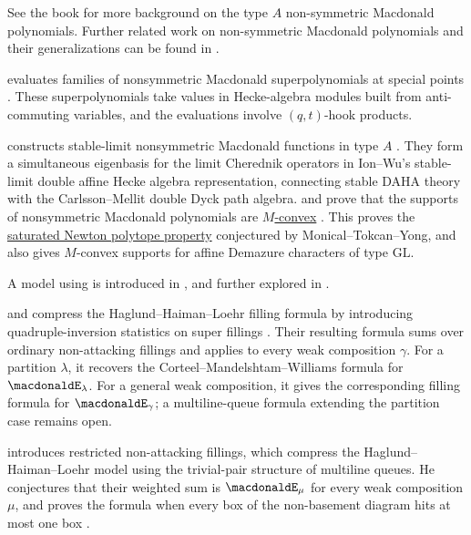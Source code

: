 See the book \cite{qtCatalanBook} for more background on the type $A$
non-symmetric Macdonald polynomials.
Further related work on non-symmetric Macdonald polynomials and their
generalizations can be found in
\cite{Alexandersson2015gbMacdonald,AlexanderssonSawhney2017,AlexanderssonSawhney2019}.

 evaluates families of nonsymmetric Macdonald
superpolynomials at special points \cite{Dunkl2021SuperMacdonald}.  These
superpolynomials take values in Hecke-algebra modules built from
anti-commuting variables, and the evaluations involve $(q,t)$-hook products.

 constructs stable-limit
nonsymmetric Macdonald functions in type $A$ \cite{Weising2023x}.  They form a
simultaneous eigenbasis for the limit Cherednik operators in Ion--Wu's
stable-limit double affine Hecke algebra representation, connecting stable
DAHA theory with the Carlsson--Mellit double Dyck path algebra.
 and
 prove that the supports of nonsymmetric Macdonald
polynomials are \hyperref[mConvexSet]{$M$-convex} \cite{WeisingBlack2025x}.
This proves the \hyperref[SNP]{saturated Newton polytope property} conjectured
by Monical--Tokcan--Yong, and also gives $M$-convex supports for affine
Demazure characters of type $\mathrm{GL}$.

A model using \label{multilineQueueMacdonald} is
introduced in \cite{CorteelMandelshtamWilliams2018x}, and further explored in
\cite{CorteelMandelshtamMasonWilliams2019x}.

 and  compress the
Haglund--Haiman--Loehr filling formula by introducing quadruple-inversion
statistics on super fillings
\cite[Thm.~1.5]{JinLin2026x}.  Their resulting formula sums over ordinary
non-attacking fillings and applies to every weak composition $\gamma$.
For a partition $\lambda$, it recovers the Corteel--Mandelshtam--Williams
formula for $\macdonaldE_\lambda$.  For a general weak composition, it gives
the corresponding filling formula for $\macdonaldE_\gamma$; a multiline-queue
formula extending the partition case remains open.

 introduces restricted non-attacking fillings,
which compress the Haglund--Haiman--Loehr model using the trivial-pair
structure of multiline queues.  He conjectures that their weighted sum is
\(\macdonaldE_\mu\) for every weak composition \(\mu\), and proves the formula
when every box of the non-basement diagram hits at most one box
\cite[Conj.~1.1 and Thm.~1.2]{Stewart2026x}.

